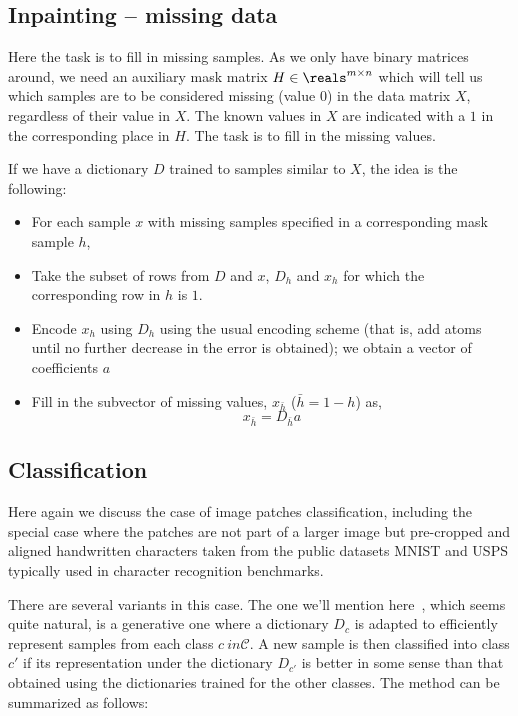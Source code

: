 \documentclass[a4paper]{IEEEtran}
\begin{document}
\subsection{Inpainting -- missing data}

Here the task is to fill in missing samples. As we only have binary matrices around, we need an auxiliary mask matrix $H \in \reals^{m{\times}n}$ which will tell us which samples are to be considered missing (value $0$) in the data matrix $X$, regardless of their value in $X$. The known values in $X$ are indicated with a $1$ in the corresponding place in $H$. The task is to fill in the missing values.

If we have a dictionary $D$ trained to samples similar to $X$, the idea is the following:

\begin{itemize}
\item For each sample $x$ with missing samples specified in a corresponding mask sample $h$,
\item Take the subset of rows from $D$ and $x$, $D_{h}$ and  $x_{h}$ for which the corresponding row in $h$ is $1$.
\item Encode $x_{h}$ using $D_{h}$ using the usual encoding scheme (that is, add atoms until no further decrease in the error is obtained); we obtain a vector of coefficients $a$
\item Fill in the subvector of missing values, $x_{\bar h}$ ($\bar h = 1 - h$) as, $$x_{\bar h} = D_{\bar h}a$$
\end{itemize}

\subsection{Classification}

Here again we discuss the case of image patches classification, including the special case where the patches are not part of a larger image but pre-cropped and aligned handwritten characters taken from the public datasets MNIST and USPS typically used in character recognition benchmarks.

There are several variants in this case. The one we'll mention here~\cite{ramirez10cvpr}, which seems quite natural, is a generative one where a dictionary $D_c$ is  adapted to efficiently represent samples from each class $c  \ in \mathcal{C}$. A new sample is then classified into class $c'$ if its representation under the dictionary $D_{c'}$ is better in some sense than that obtained using the dictionaries trained for the other classes. The method  can be summarized as follows:
\end{document}
